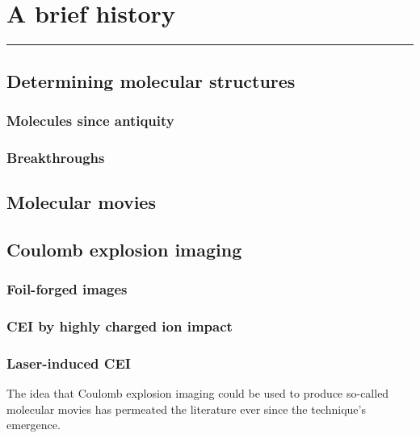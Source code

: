 \chapter{A brief history}\label{ch:history}

\vspace{-1.5 em}
\minitoc\hrule
\vspace{1.5 em}

\section{Determining molecular structures}
\subsection{Molecules since antiquity}
\subsection{Breakthroughs}

\section{Molecular movies}

\section{Coulomb explosion imaging}
\subsection{Foil-forged images}
\subsection{CEI by highly charged ion impact}
\subsection{Laser-induced CEI}

The idea that Coulomb explosion imaging could be used to produce so-called molecular movies has permeated the literature ever since the technique's emergence.

